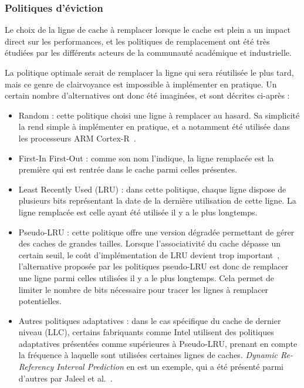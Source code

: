 \subsubsection{Politiques d'éviction}

Le choix de la ligne de cache à remplacer lorsque le cache est plein a un impact direct sur les performances, et les politiques de remplacement ont été très étudiées par les différents acteurs de la communauté académique et industrielle.

La politique optimale serait de remplacer la ligne qui sera réutilisée le plus tard, mais ce genre de clairvoyance est impossible à implémenter en pratique.
Un certain nombre d'alternatives ont donc été imaginées, et sont décrites ci-après :
\begin{itemize}
  \item Random : cette politique choisi une ligne à remplacer au hasard. Sa simplicité la rend simple à implémenter en pratique, et a notamment été utilisée dans les processeurs ARM Cortex-R~\cite{ARM-Cortex-R}.
  \item First-In First-Out : comme son nom l'indique, la ligne remplacée est la première qui est rentrée dans le cache parmi celles présentes.
  \item Least Recently Used (LRU) : dans cette politique, chaque ligne dispose de plusieurs bits représentant la date de la dernière utilisation de cette ligne. La ligne remplacée est celle ayant été utilisée il y a le plus longtemps.
  \item Pseudo-LRU : cette politique offre une version dégradée permettant de gérer des caches de grandes tailles.
Lorsque l'associativité du cache dépasse un certain seuil, le coût d'implémentation de LRU devient trop important~\cite{Kedzierski2010}, l'alternative proposée par les politiques pseudo-LRU est donc de remplacer une ligne parmi celles utilisées il y a le plus longtemps.
Cela permet de limiter le nombre de bits nécessaire pour tracer les lignes à remplacer potentielles.
  \item Autres politiques adaptatives : dans le cas spécifique du cache de dernier niveau (LLC), certains fabriquants comme Intel utilisent des politiques adaptatives présentées comme supérieures à Pseudo-LRU, prenant en compte la fréquence à laquelle sont utilisées certaines lignes de caches.
    \emph{Dynamic Re-Referency Interval Prediction} en est un exemple, qui a été présenté parmi d'autres par Jaleel et al.~\cite{Jaleel2010}.
\end{itemize}

